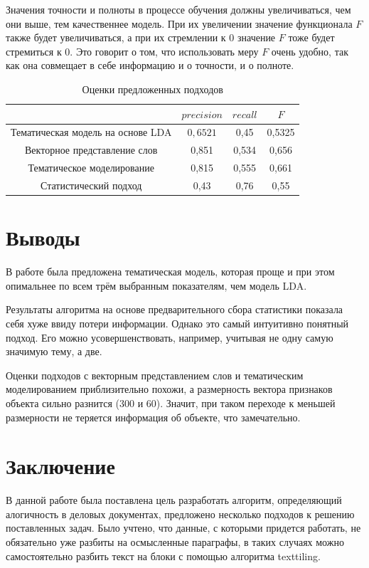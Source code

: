 \documentclass[12pt]{article}
\newcommand{\nextline}{\tabularnewline\hline}
\begin{document}
Значения точности и полноты в процессе обучения должны увеличиваться, чем они выше, тем качественнее модель. При их увеличении значение функционала $F$ также будет увеличиваться, а при их стремлении к $0$ значение $F$ тоже будет стремиться к $0$. Это говорит о том, что использовать меру $F$ очень удобно, так как она совмещает в себе информацию и о точности, и о полноте.

\begin{table}[h]
	\centering
	\vspace{-0.5cm}
	\caption{Оценки предложенных подходов}
	\vspace{0.2cm}
	\label{table3}
	\begin{tabular}{|c|c|c|c|}
		\hline
		& $precision$ & $recall$ & $F$      \nextline 
		Тематическая модель на основе LDA                          & $0,6521$    & 0,45   & 0,5325 \nextline 
		Векторное представление слов & 0,851     & 0,534  & 0,656  \nextline 
		Тематическое моделирование   & 0,815     & 0,555  & 0,661  \nextline 
		Статистический подход        & 0,43      & 0,76   & 0,55  \nextline
	\end{tabular}
\end{table}

\newpage

\section{Выводы}
В работе была предложена тематическая модель, которая проще и при этом опимальнее по всем трём выбранным показателям, чем модель LDA. 

Результаты алгоритма на основе предварительного сбора статистики показала себя хуже ввиду потери информации. Однако это самый интуитивно понятный подход. Его можно усовершенствовать, например, учитывая не одну самую значимую тему, а две.

Оценки подходов с векторным представлением слов и тематическим моделированием приблизительно похожи, а размерность вектора признаков объекта сильно разнится (300 и 60). Значит, при таком переходе к меньшей размерности не теряется информация об объекте, что замечательно.

\newpage
\section{Заключение}
В данной работе была поставлена цель разработать алгоритм, определяющий алогичность в деловых документах, предложено несколько подходов к решению поставленных задач. Было учтено, что данные, с которыми придется работать, не обязательно уже разбиты на осмысленные параграфы, в таких случаях можно самостоятельно разбить текст на блоки с помощью алгоритма texttiling. 
\end{document}

